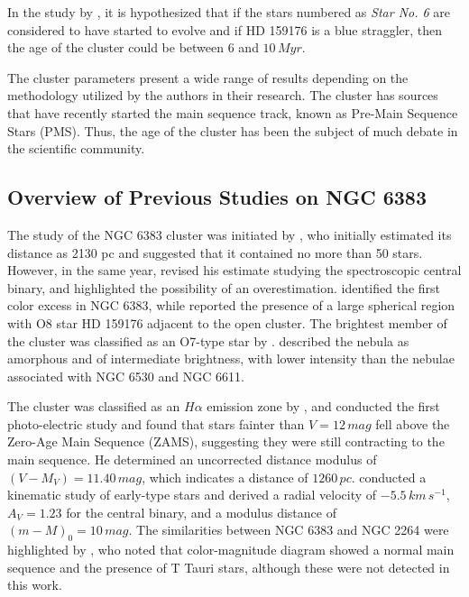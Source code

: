 \documentclass[fleqn,usenatbib,usedcolumn,useAMS]{mnras}
\newcommand{\kms}{\,km\,s^{-1}} %
\begin{document}
In the study by \citet{2018A&A...610A..30A}, it is hypothesized that if the stars numbered as \textit{Star No. 6} are considered to have started to evolve and if HD 159176 is a blue straggler, then the age of the cluster could be between $6$ and $10\,Myr$.

The cluster parameters present a wide range of results depending on the methodology utilized by the authors in their research. The cluster has sources that have recently started the main sequence track, known as Pre-Main Sequence Stars (PMS). Thus, the age of the cluster has been the subject of much debate in the scientific community.

\subsection{Overview of Previous Studies on NGC 6383}\label{literature}

The study of the NGC 6383 cluster was initiated by \citet{1930LicOB..14..154T}, who initially estimated its distance as 2130 pc and suggested that it contained no more than 50 stars. However, in the same year, \citet{1930PASP...42..342T} revised his estimate studying the spectroscopic central binary, and highlighted the possibility of an overestimation. \citet{1937LicOB..18...89Z} identified the first color excess in NGC 6383, while \citet{bok_bester_wade_1953} reported the presence of a large spherical region with O8 star HD 159176 adjacent to the open cluster. The brightest member of the cluster was classified as an O7-type star by \citet{1954CoBAO..12....3M}. \citet{1959ApJS....4..257S} described the nebula as amorphous and of intermediate brightness, with lower intensity than the nebulae associated with NGC 6530 and NGC 6611. 

The cluster was classified as an $H\alpha$ emission zone by \citet{1960MNRAS.121..103R}, and \citet{1961RGOB...27...61E} conducted the first photo-electric study and found that stars fainter than $V = 12\,mag$ fell above the Zero-Age Main Sequence (ZAMS), suggesting they were still contracting to the main sequence. He determined an uncorrected distance modulus of $(V - M_V) = 11.40\,mag$, which indicates a distance of $1260\,pc$. \citet{1962AJ.....67..491R} conducted a kinematic study of early-type stars and derived a radial velocity of $-5.5 \kms$, $A_V = 1.23$ for the central binary, and a modulus distance of $(m - M)_0 = 10 \,mag$. The similarities between NGC 6383 and NGC 2264 were highlighted by \citet{1965CoBos..32....0T}, who noted that \citet{1961RGOB...27...61E} color-magnitude diagram showed a normal main sequence and the presence of T Tauri stars, although these were not detected in this work.
\end{document}
